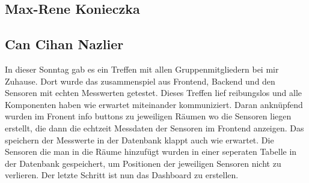\documentclass[]{article}
\begin{document}
\subsection{Max-Rene Konieczka}

\subsection{Can Cihan Nazlier}
In dieser Sonntag gab es ein Treffen mit allen Gruppenmitgliedern bei mir Zuhause. Dort wurde das zusammenspiel aus Frontend, Backend und den Sensoren mit echten Messwerten getestet. Dieses Treffen lief reibungslos und alle Komponenten haben wie erwartet miteinander kommuniziert. Daran anknüpfend wurden im Fronent info buttons zu jeweiligen Räumen wo die Sensoren liegen erstellt, die dann die echtzeit Messdaten der Sensoren im Frontend anzeigen. Das speichern der Messwerte in der Datenbank klappt auch wie erwartet.
Die Sensoren die man in die Räume hinzufügt wurden in einer seperaten Tabelle in der Datenbank gespeichert, um Positionen der jeweiligen Sensoren nicht zu verlieren.
Der letzte Schritt ist nun das Dashboard zu erstellen.

\printbibliography
\end{document}
